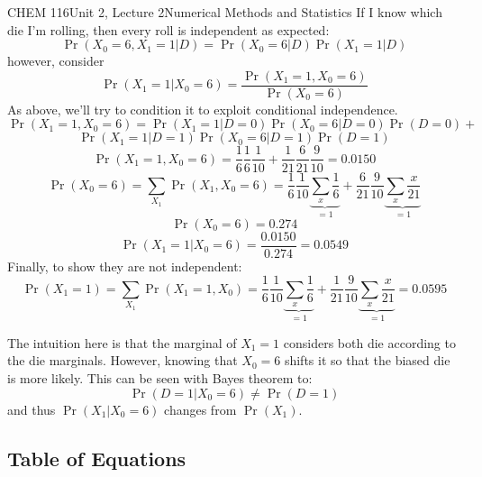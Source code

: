 \documentclass{article}
\begin{document}
\begin{tdoc}{CHEM 116}{Unit 2, Lecture 2}{Numerical Methods and Statistics}
If I know which die I'm rolling, then every roll is independent
as expected: 
\[
\Pr (X_0 = 6, X_1 = 1 | D) = \Pr (X_0 = 6 | D) \Pr (X_1 = 1 | D)
\]
however, consider 
\[
\Pr (X_1 = 1 | X_0 = 6) = \frac{\Pr(X_1 = 1, X_0 = 6)}{\Pr (X_0 = 6)}
\]
As above, we'll try to condition it to exploit conditional
independence.
\[
\Pr(X_1 = 1, X_0 = 6) = \Pr(X_1 = 1 | D = 0) \Pr(X_0 = 6 | D = 0) \Pr (D = 0) + 
\]
\[
\Pr(X_1 = 1 | D = 1) \Pr(X_0 = 6 | D = 1) \Pr (D = 1)
\]
\[
\Pr(X_1 = 1, X_0 = 6) = \frac{1}{6}\frac{1}{6}\frac{1}{10} + \frac{1}{21}\frac{6}{21}\frac{9}{10} = 0.0150
\]
\[
\Pr(X_0 = 6) = \sum_{X_1} \Pr(X_1, X_0 = 6) = \frac{1}{6}\frac{1}{10}\underbrace{\sum_{x} \frac{1}{6}}_{=1} + \frac{6}{21}\frac{9}{10} \underbrace{\sum_{x} \frac{x}{21}}_{=1}
\]
\[
\Pr(X_0 = 6)  = 0.274
\]
\[
\Pr (X_1 = 1 | X_0 = 6) = \frac{0.0150}{0.274} = 0.0549
\]
Finally, to show they are not independent:
\[
\Pr(X_1 = 1) = \sum_{X_1} \Pr(X_1 = 1, X_0) = \frac{1}{6}\frac{1}{10}\underbrace{\sum_{x} \frac{1}{6}}_{=1} + \frac{1}{21}\frac{9}{10} \underbrace{\sum_{x} \frac{x}{21}}_{=1} = 0.0595
\]

The intuition here is that the marginal of $X_1 = 1$ considers both
die according to the die marginals. However, knowing that $X_0 = 6$
shifts it so that the biased die is more likely. This can be seen with
Bayes theorem to:
\[
\Pr(D = 1 | X_0 = 6) \neq \Pr (D=1)
\]
and thus $\Pr (X_1 | X_0 = 6)$ changes from $\Pr(X_1)$.

\subsection{Table of Equations}


\end{tdoc}
\end{document}
